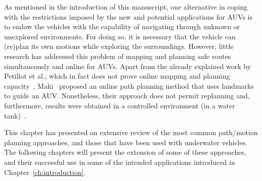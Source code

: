 As mentioned in the introduction of this manuscript, one alternative in coping
with the restrictions imposed by the new and potential applications for
\acp{AUV} is to endow the vehicles with the capability of navigating through
unknown or unexplored environments. For doing so, it is necessary that the
vehicle can (re)plan its own motions while exploring the surroundings. However,
little research has addressed this problem of mapping and planning safe routes
simultaneously and online for \acp{AUV}. Apart from the already explained work by
Petillot et al., which in fact does not prove online mapping and planning
capacity~\cite{Petillot2001}, Maki \etal~proposed an online path planning method
that uses landmarks to guide an \ac{AUV}. Nonetheless, their approach does not
permit replanning and, furthermore, results were obtained in a controlled
environment (\ie in a water tank)~\cite{Maki2007}.

This chapter has presented an extensive review of the most common path/motion
planning approaches, and those that have been used with underwater vehicles. The
following chapters will present the extension of some of these approaches, and
their successful use in some of the intended applications introduced in
Chapter~\ref{ch:introduction}.

